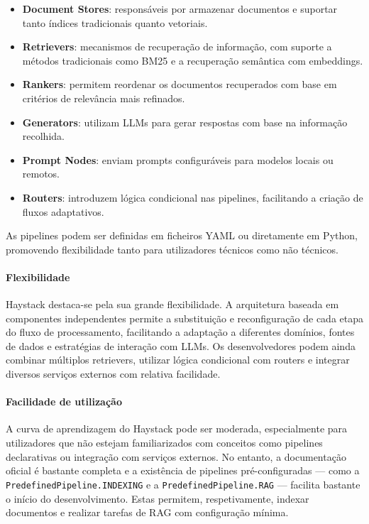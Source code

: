 \begin{itemize} \item \textbf{Document Stores}: responsáveis por armazenar documentos e suportar tanto índices tradicionais quanto vetoriais. \item \textbf{Retrievers}: mecanismos de recuperação de informação, com suporte a métodos tradicionais como BM25 e a recuperação semântica com embeddings. \item \textbf{Rankers}: permitem reordenar os documentos recuperados com base em critérios de relevância mais refinados. \item \textbf{Generators}: utilizam LLMs para gerar respostas com base na informação recolhida. \item \textbf{Prompt Nodes}: enviam prompts configuráveis para modelos locais ou remotos. \item \textbf{Routers}: introduzem lógica condicional nas pipelines, facilitando a criação de fluxos adaptativos. \end{itemize}

As pipelines podem ser definidas em ficheiros YAML ou diretamente em Python, promovendo flexibilidade tanto para utilizadores técnicos como não técnicos.

\paragraph{Flexibilidade}

Haystack destaca-se pela sua grande flexibilidade. A arquitetura baseada em componentes independentes permite a substituição e reconfiguração de cada etapa do fluxo de processamento, facilitando a adaptação a diferentes domínios, fontes de dados e estratégias de interação com LLMs. Os desenvolvedores podem ainda combinar múltiplos retrievers, utilizar lógica condicional com routers e integrar diversos serviços externos com relativa facilidade.

\paragraph{Facilidade de utilização}

A curva de aprendizagem do Haystack pode ser moderada, especialmente para utilizadores que não estejam familiarizados com conceitos como pipelines declarativas ou integração com serviços externos. No entanto, a documentação oficial é bastante completa e a existência de pipelines pré-configuradas — como a \texttt{PredefinedPipeline.INDEXING} e a \texttt{PredefinedPipeline.RAG} — facilita bastante o início do desenvolvimento. Estas permitem, respetivamente, indexar documentos e realizar tarefas de RAG com configuração mínima.


